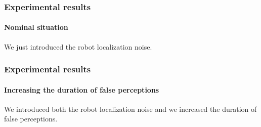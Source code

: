 \begin{frame}
	\frametitle{Experimental results}
	\framesubtitle{Nominal situation}
	
	\vspace{0.2cm}
	
	We just introduced the robot localization noise.
	
	\begin{center}
	\end{center}
\end{frame}

\begin{frame}
	\frametitle{Experimental results}
	\framesubtitle{Increasing the duration of false perceptions}
	
	\vspace{0.3cm}
	
	We introduced both the robot localization noise and we increased the duration of false perceptions.
	
	\vspace{0.1cm}
	
	\begin{center}
	\end{center}
\end{frame}

